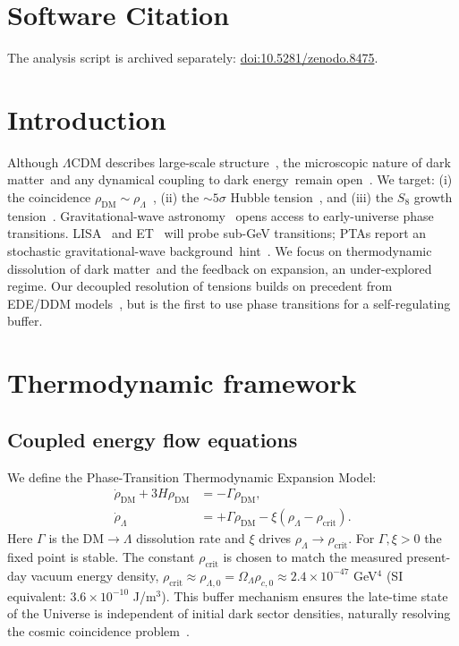 \documentclass[preprint,aps,prd,onecolumn,nofootinbib,longbibliography]{revtex4-2}
\newcommand{\DM}{dark matter}
\newcommand{\DE}{dark energy}
\newcommand{\SGWB}{stochastic gravitational-wave background}
\newcommand{\PTTEM}{Phase-Transition Thermodynamic Expansion Model}
\numberwithin{equation}{section}
\begin{document}
\section*{Software Citation}
The analysis script is archived separately:
\href{https://doi.org/10.5281/zenodo.8475}{doi:10.5281/zenodo.8475}.
\section{Introduction}
\label{sec:intro}
Although $\Lambda$CDM describes large-scale structure~\cite{Planck2020,Riess2022}, the microscopic nature of \DM\ and any dynamical coupling to \DE\ remain open~\cite{Peebles2003,Frieman2008}. We target: (i) the coincidence $\rho_{\mathrm{DM}}\!\sim\!\rho_\Lambda$~\cite{Zlatev1999}, (ii) the $\sim\!5\sigma$ Hubble tension~\cite{DiValentino2021}, and (iii) the $S_8$ growth tension~\cite{Abdalla2022}. Gravitational-wave astronomy~\cite{Maggiore2000,Caprini2018} opens access to early-universe phase transitions. LISA~\cite{Amaro2017} and ET~\cite{Punturo2010} will probe sub-GeV transitions; PTAs report an \SGWB\ hint~\cite{Agazie2023,Antoniadis2023}. We focus on thermodynamic dissolution of \DM\ and the feedback on expansion, an under-explored regime. Our decoupled resolution of tensions builds on precedent from EDE/DDM models~\cite{Karwal2021}, but is the first to use phase transitions for a self-regulating buffer.

\section{Thermodynamic framework}
\label{sec:thermo}

\subsection{Coupled energy flow equations}
\label{sec:flow}
We define the \PTTEM:
\begin{align}
\dot{\rho}_{\mathrm{DM}} + 3H\rho_{\mathrm{DM}} &= -\Gamma\rho_{\mathrm{DM}}, \label{eq:dm}\\
\dot{\rho}_\Lambda &= +\Gamma\rho_{\mathrm{DM}}-\xi(\rho_\Lambda-\rho_{\mathrm{crit}}). \label{eq:lambda}
\end{align}
Here $\Gamma$ is the DM$\!\to\!\Lambda$ dissolution rate and $\xi$ drives $\rho_\Lambda\!\to\!\rho_{\mathrm{crit}}$. For $\Gamma,\xi>0$ the fixed point is stable. The constant $\rho_{\mathrm{crit}}$ is chosen to match the measured present-day vacuum energy density, $\rho_{\mathrm{crit}} \approx \rho_{\Lambda,0} = \Omega_\Lambda \rho_{c,0} \approx 2.4\times 10^{-47}$ GeV$^4$ (SI equivalent: $3.6\times 10^{-10}$ J/m$^3$). This buffer mechanism ensures the late-time state of the Universe is independent of initial dark sector densities, naturally resolving the cosmic coincidence problem~\cite{Zlatev1999}.
\end{document}
